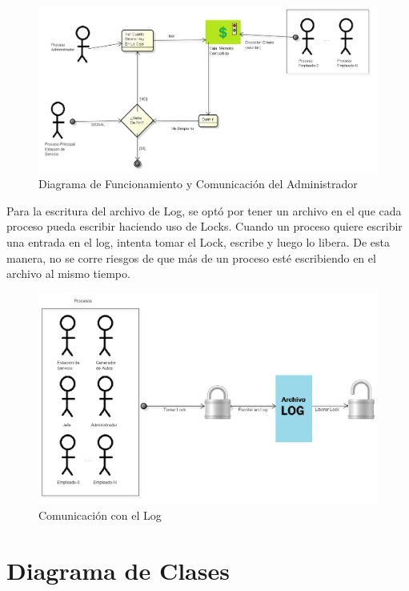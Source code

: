 \documentclass[a4paper,12pt]{article}
\begin{document}
\begin{figure}
\centering
\includegraphics[scale=0.45]{Diagramas/administrador.png}   
\caption{Diagrama de Funcionamiento y Comunicación del Administrador}
\label{fig:Administrador}
\end{figure}

\newpage

	Para la escritura del archivo de Log, se optó por tener un archivo en el que cada proceso pueda escribir haciendo uso de Locks. Cuando un proceso quiere escribir una entrada en el log, intenta tomar el Lock, escribe y luego lo libera. De esta manera, no se corre riesgos de que más de un proceso esté escribiendo en el archivo al mismo tiempo.

\begin{figure}[h!]
\centering
\includegraphics[scale=0.4]{Diagramas/Log.png} 
\caption{Comunicación con el Log}
\label{fig:Log}
\end{figure}	

\newpage

\section{Diagrama de Clases}
\end{document}
